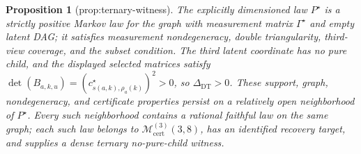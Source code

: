 \documentclass{article}
\newtheorem{proposition}{Proposition}
\begin{document}
\begin{proposition}[prop:ternary-witness]\label{prop:ternary-witness}
The explicitly dimensioned law \(P^{\star}\) is a strictly positive Markov law for the graph with measurement matrix \(\Gamma^{\star}\) and empty latent DAG; it satisfies measurement nondegeneracy, double triangularity, third-view coverage, and the subset condition. The third latent coordinate has no pure child, and the displayed selected matrices satisfy \(\det(B_{a,k,u})=(c^{\star}_{s(a,k),\rho_a(k)})^2>0\), so \(\Delta_{\mathrm{DT}}>0\). These support, graph, nondegeneracy, and certificate properties persist on a relatively open neighborhood of \(P^{\star}\). Every such neighborhood contains a rational faithful law on the same graph; each such law belongs to \(\mathcal M_{\mathrm{cert}}^{(3)}(3,8)\), has an identified recovery target, and supplies a dense ternary no-pure-child witness.
\end{proposition}
\end{document}
